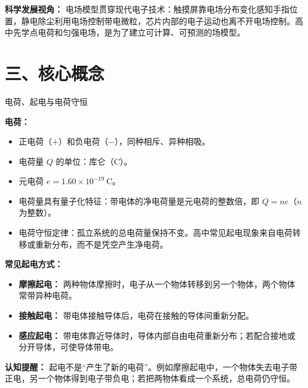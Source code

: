 \textbf{科学发展视角：} 电场模型贯穿现代电子技术：触摸屏靠电场分布变化感知手指位置，静电除尘利用电场控制带电微粒，芯片内部的电子运动也离不开电场控制。高中先学点电荷和匀强电场，是为了建立可计算、可预测的场模型。

\section*{三、核心概念}

\begin{conceptbox}{电荷、起电与电荷守恒}

\textbf{电荷：}
\begin{itemize}
  \item 正电荷（$+$）和负电荷（$-$），同种相斥、异种相吸。
  \item 电荷量 $Q$ 的单位：库仑（$\mathrm{C}$）。
  \item 元电荷 $e = 1.60 \times 10^{-19}\ \mathrm{C}$。
  \item 电荷量具有量子化特征：带电体的净电荷量是元电荷的整数倍，即 $Q=ne$（$n$ 为整数）。
  \item 电荷守恒定律：孤立系统的总电荷量保持不变。高中常见起电现象来自电荷转移或重新分布，而不是凭空产生净电荷。
\end{itemize}

\textbf{常见起电方式：}
\begin{itemize}
  \item \textbf{摩擦起电：} 两种物体摩擦时，电子从一个物体转移到另一个物体，两个物体常带异种电荷。
  \item \textbf{接触起电：} 带电体接触导体后，电荷在接触的导体间重新分配。
  \item \textbf{感应起电：} 带电体靠近导体时，导体内部自由电荷重新分布；若配合接地或分开导体，可使导体带电。
\end{itemize}

\begin{center}


\label{fig:charging-methods}
\end{center}

\textbf{认知提醒：} 起电不是“产生了新的电荷”。例如摩擦起电中，一个物体失去电子带正电，另一个物体得到电子带负电；若把两物体看成一个系统，总电荷仍守恒。
\end{conceptbox}

